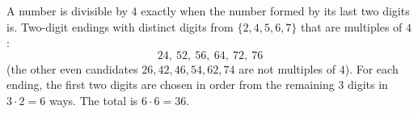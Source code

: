 A number is divisible by $4$ exactly when the number formed by its last two digits is. Two-digit endings with distinct digits from $\{2,4,5,6,7\}$ that are multiples of $4$:
\[
24,\ 52,\ 56,\ 64,\ 72,\ 76
\]
(the other even candidates $26,42,46,54,62,74$ are not multiples of $4$). For each ending, the first two digits are chosen in order from the remaining $3$ digits in $3\cdot2=6$ ways. The total is $6\cdot6=\boxed{36}$.
